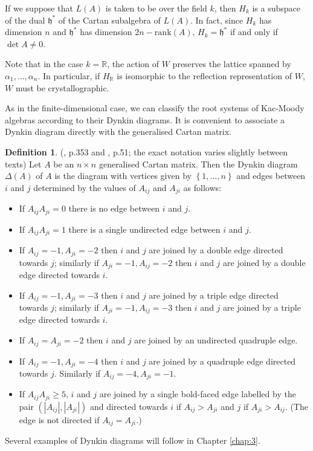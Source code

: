 \documentclass[11pt,a4paper]{report}
\theoremstyle{definition}
\newtheorem{definition}[theorem]{Definition}
\begin{document}
If we suppose that $L(A)$ is taken to be over the field $k$, then $H_k$ is a subspace of the dual $\mathfrak{h}^*$ of the Cartan subalgebra of $L(A)$. In fact, since $H_k$ has dimension $n$ and $\mathfrak{h}^*$ has dimension $2n - \text{rank}(A)$, $H_k = \mathfrak{h}^*$ if and only if $\det A \neq 0$.

Note that in the case $k = \mathbb{R}$, the action of $W$ preserves the lattice spanned by $\alpha_1, \ldots, \alpha_n$. In particular, if $H_\mathbb{R}$ is isomorphic to the reflection representation of $W$, $W$ must be crystallographic. 

As in the finite-dimensional case, we can classify the root systems of Kac-Moody algebras according to their Dynkin diagrams. It is convenient to associate a Dynkin diagram directly with the generalised Cartan matrix. 

\begin{definition} \label{def:dynkin} (\cite{Carter}, p.353 and \cite{Kac}, p.51; the exact notation varies slightly between texts) Let $A$ be an $n \times n$ generalised Cartan matrix. Then the Dynkin diagram $\Delta(A)$ of $A$ is the diagram with vertices given by $\left\{1,\ldots,n\right\}$ and edges between $i$ and $j$ determined by the values of $A_{ij}$ and $A_{ji}$ as follows:

\begin{itemize}
\item If $A_{ij} A_{ji} = 0$ there is no edge between $i$ and $j$.

\item If $A_{ij} A_{ji} = 1$ there is a single undirected edge between $i$ and $j$.

\item If $A_{ij} = -1, A_{ji} = -2$ then $i$ and $j$ are joined by a double edge directed towards $j$; similarly if $A_{ji} = -1, A_{ij} = -2$ then $i$ and $j$ are joined by a double edge directed towards $i$.

\item If $A_{ij} = -1, A_{ji} = -3$ then $i$ and $j$ are joined by a triple edge directed towards $j$; similarly if $A_{ji} = -1, A_{ij} = -3$ then $i$ and $j$ are joined by a triple edge directed towards $i$.

\item If $A_{ij} = A_{ji} = -2$ then $i$ and $j$ are joined by an undirected quadruple edge. 

\item If $A_{ij} = -1, A_{ji} = -4$ then $i$ and $j$ are joined by a quadruple edge directed towards $j$. Similarly if $A_{ij} = -4, A_{ji} = -1$.

\item If $A_{ij} A_{ji} \geq 5$, $i$ and $j$ are joined by a single bold-faced edge labelled by the  pair $(|A_{ij}|, |A_{ji}|)$ and directed towards $i$ if $A_{ij} > A_{ji}$ and $j$ if $A_{ji} > A_{ij}$. (The edge is not directed if $A_{ij} = A_{ji}$.)
\end{itemize}
\end{definition}
Several examples of Dynkin diagrams will follow in Chapter \ref{chap:3}.
\end{document}

